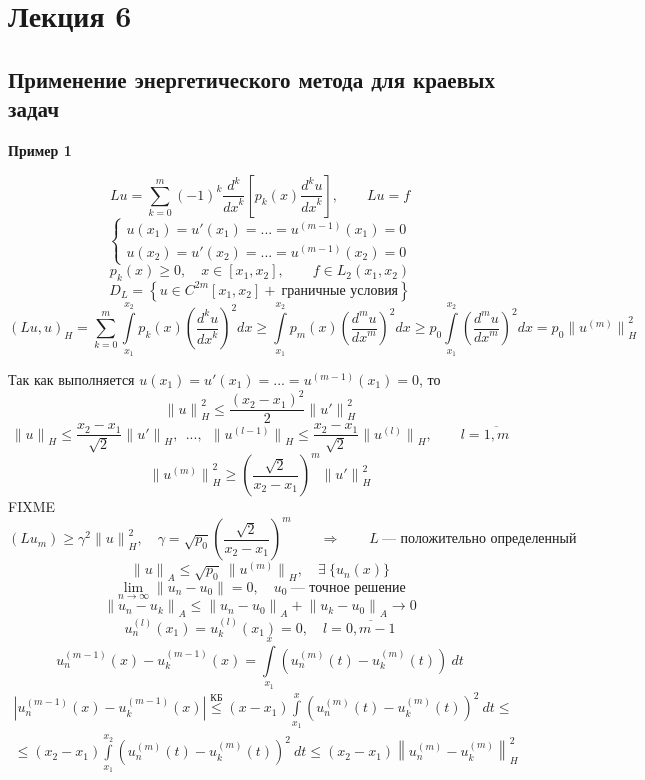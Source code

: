 \documentclass[12pt, a4paper]{article}
\newcommand{\Int}{\int\limits}
\newcommand{\Sum}{\sum\limits}
\begin{document}
\newpage

\section{Лекция 6}

\subsection{Применение энергетического метода для краевых задач}

\textbf{Пример 1}

\[ Lu =\Sum_{k=0}^m (-1)^k \frac{d^k}{{dx}^k} \left[ p_k(x) \frac{d^k u}{{dx}^k} \right], \qquad Lu = f \]
\[ \left\{ \begin{array}{l}
	u(x_1) = u'(x_1) = ... = u^{(m-1)}(x_1) = 0 \\ 
	u(x_2) = u'(x_2) = ... = u^{(m-1)}(x_2) = 0
\end{array} \right. \]
\[ p_k(x) \geq 0, \quad x \in [x_1, x_2], \qquad f \in L_2(x_1, x_2) \]
\[ D_L = \left\{ u \in C^{2m}[x_1, x_2] + \ \text{граничные условия} \right\} \]
\[ {(Lu, u)}_H = \Sum_{k=0}^{m} \Int_{x_1}^{x_2} p_k (x) {\left(\frac{d^k u }{{dx}^k }\right)}^2 dx \geq \Int_{x_1}^{x_2} p_m (x) {\left(\frac{d^m u }{{dx}^m }\right)}^2 dx \geq p_0 \Int_{x_1}^{x_2} {\left(\frac{d^m u }{{dx}^m }\right)}^2 dx = p_0 {\|u^{(m)}\|}^2_H \]

Так как выполняется $ u(x_1) = u'(x_1) = ... = u^{(m-1)}(x_1) = 0 $, то
\[ {\| u \|}_H^2 \leq \frac{{(x_2-x_1)}^2}{2} {\| u' \|}_H^2 \]
\[ {\| u \|}_H \leq \frac{x_2 - x_1}{\sqrt{2}} {\| u' \|}_H, \ \ ..., \ \ {\| u^{(l-1)} \|}_H \leq \frac{x_2 - x_1}{\sqrt{2}} {\| u^{(l)} \|}_H, \qquad l=\overline{1,m} \]
\[ {\| u^{(m)} \|}_H^2 \geq {\left(\frac{\sqrt{2}}{x_2 - x_1}\right)}^m {\| u' \|}_H^2 \]
FIXME
\[ (L u_m ) \geq \gamma^2 {\|u\|}^2_H, \quad \gamma = \sqrt{p_0} {\left(\frac{\sqrt{2}}{x_2-x_1}\right)}^m \qquad \Rightarrow \qquad L \ \text{--- положительно определенный} \]
\[ {\|u\|}_A \leq \sqrt{p_0} \ {\| u^{(m)} \|}_H, \quad \exists \ \{ u_n (x) \}\]
\[ \underset{n \rightarrow \infty}{\lim} {\| u_n - u_0 \|} = 0, \quad u_0 \ \textrm{--- точное решение} \]
\[ {\|u_n - u_k \|}_A \leq {\|u_n - u_0\|}_A + {\| u_k - u_0\|}_A \rightarrow 0 \]
\[ u^{(l)}_n (x_1) = u^{(l)}_k (x_1) = 0, \quad l = \overline{0, m-1} \]
\[ u^{(m - 1)}_n (x) - u^{(m - 1)}_k (x) = \Int_{x_1}^{x} \left( u^{(m)}_n (t) - u^{(m)}_k (t) \right) \ dt \]
\begin{multline*}
	\left| u^{(m - 1)}_n (x) - u^{(m - 1)}_k (x) \right| \overset{\text{КБ}}{\leq} (x - x_1) \Int_{x_1}^{x} {\left( u^{(m)}_n (t) - u^{(m)}_k (t) \right)}^2 \ dt \leq \\
	\leq (x_2 - x_1) \Int_{x_1}^{x_2} {\left( u^{(m)}_n (t) - u^{(m)}_k (t) \right)}^2 \ dt \leq (x_2 - x_1) {\left\| u^{(m)}_n - u^{(m)}_k \right\|}_H^2
\end{multline*}
\end{document}
